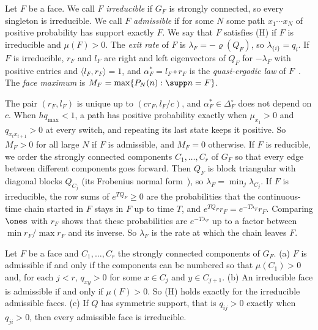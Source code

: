 \begin{definition}[faces]\label{def:faces}
Let $F$ be a face. We call $F$ \emph{irreducible} if $G_F$ is strongly connected, so every
singleton is irreducible. We call $F$ \emph{admissible} if for some $N$ some path
$x_1\cdots x_N$ of positive probability has support exactly $F$. We say that $F$ satisfies
\textup{(H)} if $F$ is irreducible and $\mu(F)>0$. The \emph{exit rate} of $F$ is
$\lambda_F=-\varrho(Q_F)$, so $\lambda_{\{i\}}=q_i$. If $F$ is irreducible, $r_F$ and $l_F$ are
right and left eigenvectors of $Q_F$ for $-\lambda_F$ with positive entries and
$\langle l_F,r_F\rangle=1$, and $\alpha^*_F=l_F\circ r_F$ is the \emph{quasi-ergodic law} of
$F$~\cite{darrochseneta1965,darrochseneta1967}. The \emph{face maximum} is
$M_F=\max\{P_N(n):\supp n=F\}$.
\end{definition}

The pair $(r_F,l_F)$ is unique up to $(cr_F,l_F/c)$, and $\alpha^*_F\in\Delta_F^\circ$ does not
depend on $c$. When $hq_{\max}<1$, a path has positive probability exactly when $\mu_{x_1}>0$ and
$q_{x_tx_{t+1}}>0$ at every switch, and repeating its last state keeps it positive. So $M_F>0$ for
all large $N$ if $F$ is admissible, and $M_F=0$ otherwise. If $F$ is reducible, we order the
strongly connected components $C_1,\dots,C_r$ of $G_F$ so that every edge between different
components goes forward. Then $Q_F$ is block triangular with diagonal blocks $Q_{C_j}$ (its
Frobenius normal form~\cite{bermanplemmons1994}), so $\lambda_F=\min_j\lambda_{C_j}$. If $F$ is
irreducible, the row sums of $e^{TQ_F}\ge0$ are the probabilities that the continuous-time chain
started in $F$ stays in $F$ up to time $T$, and $e^{TQ_F}r_F=e^{-T\lambda_F}r_F$. Comparing $\ones$
with $r_F$ shows that these probabilities are $e^{-T\lambda_F}$ up to a factor between
$\min r_F/\max r_F$ and its inverse. So $\lambda_F$ is the rate at which the chain leaves $F$.

\begin{lemma}\label{lem:admissible}
Let $F$ be a face and $C_1,\dots,C_r$ the strongly connected components of $G_F$. \textup{(a)} $F$
is admissible if and only if the components can be numbered so that $\mu(C_1)>0$ and, for each $j<r$,
$q_{xy}>0$ for some $x\in C_j$ and $y\in C_{j+1}$. \textup{(b)} An irreducible face is admissible
if and only if $\mu(F)>0$. So \textup{(H)} holds exactly for the irreducible admissible faces.
\textup{(c)} If $Q$ has symmetric support, that is $q_{ij}>0$ exactly when $q_{ji}>0$, then every
admissible face is irreducible.
\end{lemma}

